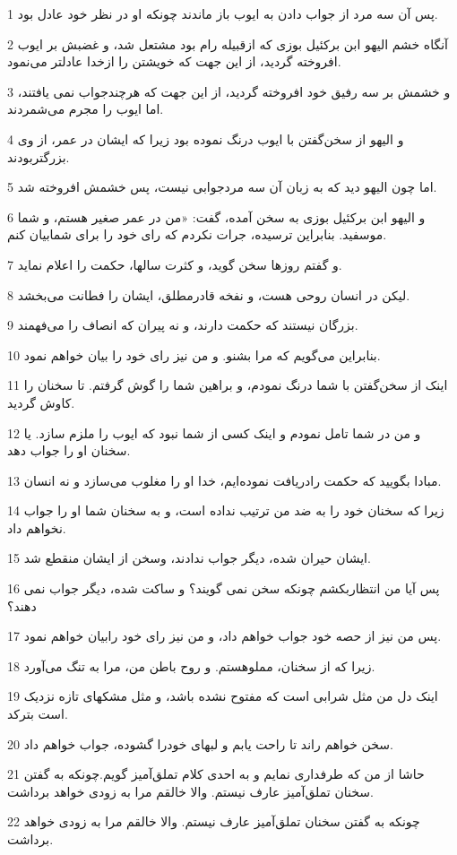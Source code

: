 \par 1 پس آن سه مرد از جواب دادن به ایوب باز ماندند چونکه او در نظر خود عادل بود.
\par 2 آنگاه خشم الیهو ابن برکئیل بوزی که ازقبیله رام بود مشتعل شد، و غضبش بر ایوب افروخته گردید، از این جهت که خویشتن را ازخدا عادلتر می‌نمود.
\par 3 و خشمش بر سه رفیق خود افروخته گردید، از این جهت که هر‌چندجواب نمی یافتند، اما ایوب را مجرم می‌شمردند.
\par 4 و الیهو از سخن‌گفتن با ایوب درنگ نموده بود زیرا که ایشان در عمر، از وی بزرگتربودند.
\par 5 اما چون الیهو دید که به زبان آن سه مردجوابی نیست، پس خشمش افروخته شد.
\par 6 و الیهو ابن برکئیل بوزی به سخن آمده، گفت: «من در عمر صغیر هستم، و شما موسفید. بنابراین ترسیده، جرات نکردم که رای خود را برای شمابیان کنم.
\par 7 و گفتم روزها سخن گوید، و کثرت سالها، حکمت را اعلام نماید.
\par 8 لیکن در انسان روحی هست، و نفخه قادرمطلق، ایشان را فطانت می‌بخشد.
\par 9 بزرگان نیستند که حکمت دارند، و نه پیران که انصاف را می‌فهمند.
\par 10 بنابراین می‌گویم که مرا بشنو. و من نیز رای خود را بیان خواهم نمود.
\par 11 اینک از سخن‌گفتن با شما درنگ نمودم، و براهین شما را گوش گرفتم. تا سخنان را کاوش گردید.
\par 12 و من در شما تامل نمودم و اینک کسی از شما نبود که ایوب را ملزم سازد. یا سخنان او را جواب دهد.
\par 13 مبادا بگویید که حکمت رادریافت نموده‌ایم، خدا او را مغلوب می‌سازد و نه انسان.
\par 14 زیرا که سخنان خود را به ضد من ترتیب نداده است، و به سخنان شما او را جواب نخواهم داد.
\par 15 ایشان حیران شده، دیگر جواب ندادند، وسخن از ایشان منقطع شد.
\par 16 پس آیا من انتظاربکشم چونکه سخن نمی گویند؟ و ساکت شده، دیگر جواب نمی دهند؟
\par 17 پس من نیز از حصه خود جواب خواهم داد، و من نیز رای خود رابیان خواهم نمود.
\par 18 زیرا که از سخنان، مملوهستم. و روح باطن من، مرا به تنگ می‌آورد.
\par 19 اینک دل من مثل شرابی است که مفتوح نشده باشد، و مثل مشکهای تازه نزدیک است بترکد.
\par 20 سخن خواهم راند تا راحت یابم و لبهای خودرا گشوده، جواب خواهم داد.
\par 21 حاشا از من که طرفداری نمایم و به احدی کلام تملق‌آمیز گویم.چونکه به گفتن سخنان تملق‌آمیز عارف نیستم. والا خالقم مرا به زودی خواهد برداشت.
\par 22 چونکه به گفتن سخنان تملق‌آمیز عارف نیستم. والا خالقم مرا به زودی خواهد برداشت.
 
